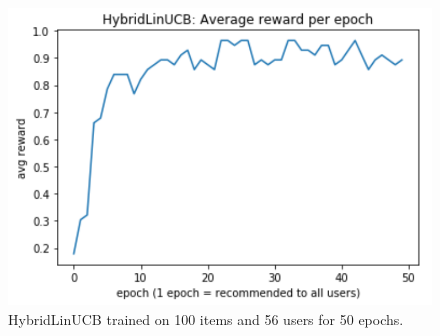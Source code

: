 \documentclass[12pt, titlepage]{article}
\begin{document}
\begin{figure}[h]
 \centering
 \includegraphics[width=\columnwidth]{img/HybridLinUCB-100items-50epochs}
 \caption{HybridLinUCB trained on 100 items and 56 users for 50 epochs.}
 \label{fig:linUCB}
\end{figure}
\end{document}
